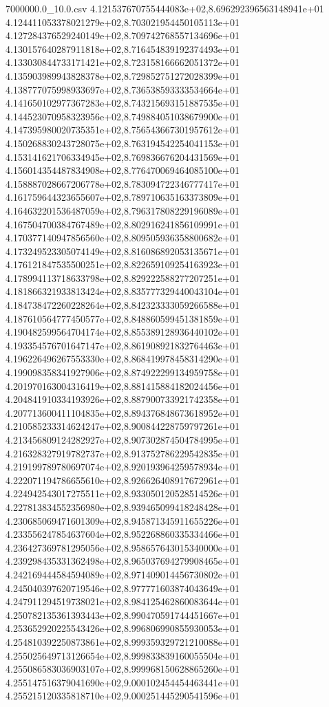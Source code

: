 \begin{filecontents*}{7000000.0_10.0.csv}
4.121537670755444083e+02,8.696292396563148941e+01
4.124411053378021279e+02,8.703021954450105113e+01
4.127284376529240149e+02,8.709742768557134696e+01
4.130157640287911818e+02,8.716454839192374493e+01
4.133030844733171421e+02,8.723158166662051372e+01
4.135903989943828378e+02,8.729852751272028399e+01
4.138777075998933697e+02,8.736538593333534664e+01
4.141650102977367283e+02,8.743215693151887535e+01
4.144523070958323956e+02,8.749884051038679900e+01
4.147395980020735351e+02,8.756543667301957612e+01
4.150268830243728075e+02,8.763194542254041153e+01
4.153141621706334945e+02,8.769836676204431569e+01
4.156014354487834908e+02,8.776470069464085100e+01
4.158887028667206778e+02,8.783094722346777417e+01
4.161759644323655607e+02,8.789710635163373809e+01
4.164632201536487059e+02,8.796317808229196089e+01
4.167504700384767489e+02,8.802916241856109991e+01
4.170377140947856560e+02,8.809505936358800682e+01
4.173249523305074149e+02,8.816086892053135671e+01
4.176121847535500251e+02,8.822659109254163923e+01
4.178994113718633798e+02,8.829222588277207251e+01
4.181866321933813424e+02,8.835777329440043104e+01
4.184738472260228264e+02,8.842323333059266588e+01
4.187610564777450577e+02,8.848860599451381859e+01
4.190482599564704174e+02,8.855389128936440102e+01
4.193354576701647147e+02,8.861908921832764463e+01
4.196226496267553330e+02,8.868419978458314290e+01
4.199098358341927906e+02,8.874922299134959758e+01
4.201970163004316419e+02,8.881415884182024456e+01
4.204841910334193926e+02,8.887900733921742358e+01
4.207713600411104835e+02,8.894376848673618952e+01
4.210585233314624247e+02,8.900844228759797261e+01
4.213456809124282927e+02,8.907302874504784995e+01
4.216328327919782737e+02,8.913752786229542835e+01
4.219199789780697074e+02,8.920193964259578934e+01
4.222071194786655610e+02,8.926626408917672961e+01
4.224942543017275511e+02,8.933050120528514526e+01
4.227813834552356980e+02,8.939465099418248428e+01
4.230685069471601309e+02,8.945871345911655226e+01
4.233556247854637604e+02,8.952268860335334466e+01
4.236427369781295056e+02,8.958657643015340000e+01
4.239298435331362498e+02,8.965037694279908465e+01
4.242169444584594089e+02,8.971409014456730802e+01
4.245040397620719546e+02,8.977771603874043649e+01
4.247911294519738021e+02,8.984125462860083644e+01
4.250782135361393443e+02,8.990470591744451667e+01
4.253652920225543426e+02,8.996806990855930053e+01
4.254810392250873861e+02,8.999359329721210088e+01
4.255025649713126654e+02,8.999833839160055504e+01
4.255086583036903107e+02,8.999968150628865260e+01
4.255147516379041690e+02,9.000102454454463441e+01
4.255215120335818710e+02,9.000251445290541596e+01

\end{filecontents*}
